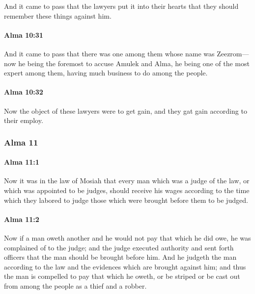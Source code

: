 			And it came to pass that the lawyers put it into their hearts
			that they should remember these things against him.

		\paragraph{Alma 10:31} %
			\label{ALMA-10-31}

			And it came to pass that
			there was one among them whose name was Zeezrom---
			now he being the foremost to accuse Amulek and Alma,
			he being one of the most expert among them,
			having much business to do among the people.

		\paragraph{Alma 10:32} %
			\label{ALMA-10-32}

			Now the object of these lawyers were to get gain,
			and they gat gain according to their employ.

	\subsubsection{Alma 11} %
		\label{ALMA-11}
		
		\paragraph{Alma 11:1} %
			\label{ALMA-11-1}

			Now it was in the law of Mosiah
			that every man which was a judge of the law,
			or which was appointed to be judges,
			should receive his wages according to the time
			which they labored to judge those
			which were brought before them to be judged.

		\paragraph{Alma 11:2} %
			\label{ALMA-11-2}

			Now if a man oweth another
			and he would not pay that which he did owe,
			he was complained of to the judge;
			and the judge executed authority and sent forth officers
			that the man should be brought before him.
			And he judgeth the man according to the law
			and the evidences which are brought against him;
			and thus the man is compelled to pay that which he oweth,
			or be striped or be cast out from among the people as a thief and a robber.

